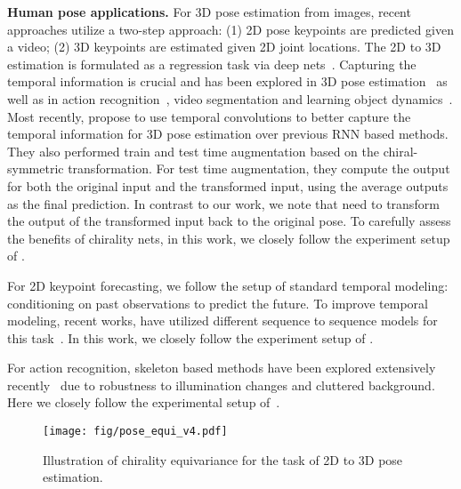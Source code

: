 \documentclass{article}
\begin{document}
\textbf{Human pose applications.} For 3D pose estimation from images, recent approaches utilize a two-step approach: (1) 2D pose keypoints are predicted given a video; (2) 3D keypoints are estimated given 2D joint locations. The 2D to 3D estimation is formulated as a regression task via deep nets~\cite{pavlakos17volumetric, tekin2017learning, martinez2017simple, sun2017compositional, fang2018learning, pavlakos2018ordinal, yang20183d, luvizon20182d, hossain2018exploiting, lee2018propagating, pavllo20193d}. Capturing the temporal information is crucial and has been explored in 3D pose estimation~\cite{hossain2018exploiting,lee2018propagating} as well as in action recognition~\cite{tran2018closer,Hussein_2019_CVPR}, video segmentation\cite{hu_nips_2017,hu_eccv_2018a} and learning object dynamics~\cite{martinez2017human,minderer2019unsupervised}. Most recently, \citet{pavllo20193d} propose to use temporal convolutions to better capture the temporal information for 3D pose estimation over previous RNN based methods. They also performed train and test time augmentation based on the chiral-symmetric transformation. For test time augmentation, they compute the output for both the original input and the transformed input, using the average outputs as the final prediction.  In contrast to our work, we note that \citet{pavllo20193d} need to transform the output of the transformed input  back to the original pose. To carefully assess the benefits of chirality nets, in this work, we closely follow the experiment setup of \citet{pavllo20193d}. 

For 2D keypoint forecasting, we follow the setup of standard temporal modeling: conditioning on past observations to predict the future. To improve temporal modeling, recent works, have utilized different sequence to sequence models  for this task~\cite{martinez2017human, chao2017forecasting, chiu2019action}. In this work, we closely follow the experiment setup of \citet{chiu2019action}. 


For action recognition, skeleton based methods have been explored extensively recently~\cite{yan2018stgcn,zhang2018adding,li2018co,si2018skeleton} due to robustness to illumination changes and cluttered background. Here we closely follow the experimental setup of~\citet{yan2018stgcn}. 

 \begin{figure}[t]
	\centering
	\hspace{-0.5cm}
		\texttt{[image: fig/pose\_equi\_v4.pdf]}\\
	\vspace*{-0.9cm}
	\caption{
	Illustration of chirality equivariance for the task of 2D to 3D pose estimation.}
	\label{fig:equi_prop}
	\vspace{-0.5cm}
\end{figure}
 
\end{document}
